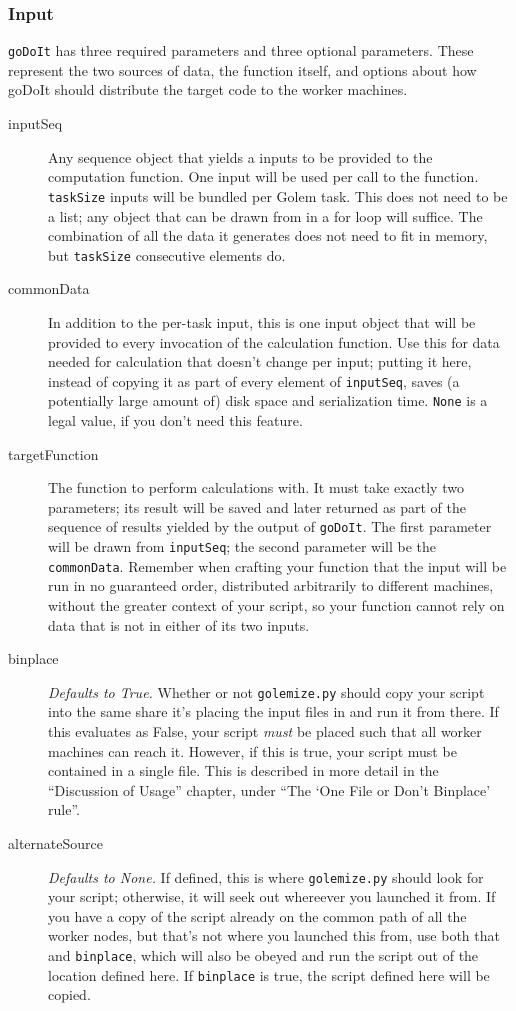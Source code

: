 \documentclass[11pt,ebook,oneside,final]{memoir} %
\begin{document}
\subsubsection*{Input}
\texttt{goDoIt} has three required parameters and three optional parameters. These represent the two sources of data, the function itself, and options about how goDoIt should distribute the target code to the worker machines.
\begin{description}
	\item[inputSeq] Any sequence object that yields a inputs to be provided to the computation function. One input will be used per call to the function. \texttt{taskSize} inputs will be bundled per Golem task. This does not need to be a list; any object that can be drawn from in a for loop will suffice. The combination of all the data it generates does not need to fit in memory, but \texttt{taskSize} consecutive elements do.
	\item[commonData] In addition to the per-task input, this is one input object that will be provided to every invocation of the calculation function. Use this for data needed for calculation that doesn't change per input; putting it here, instead of copying it as part of every element of \texttt{inputSeq}, saves (a potentially large amount of) disk space and serialization time. \texttt{None} is a legal value, if you don't need this feature.
	\item[targetFunction] The function to perform calculations with. It must take exactly two parameters; its result will be saved and later returned as part of the sequence of results yielded by the output of \texttt{goDoIt}. The first parameter will be drawn from \texttt{inputSeq}; the second parameter will be the \texttt{commonData}. Remember when crafting your function that the input will be run in no guaranteed order, distributed arbitrarily to different machines, without the greater context of your script, so your function cannot rely on data that is not in either of its two inputs.
	\item[binplace] \textit{Defaults to True.} Whether or not \texttt{golemize.py} should copy your script into the same share it's placing the input files in and run it from there. If this evaluates as False, your script \emph{must} be placed such that all worker machines can reach it. However, if this is true, your script must be contained in a single file. This is described in more detail in the ``Discussion of Usage'' chapter, under ``The `One File or Don't Binplace' rule''.
	\item[alternateSource] \textit{Defaults to None.} If defined, this is where \texttt{golemize.py} should look for your script; otherwise, it will seek out whereever you launched it from. If you have a copy of the script already on the common path of all the worker nodes, but that's not where you launched this from, use both that and \texttt{binplace}, which will also be obeyed and run the script out of the location defined here. If \texttt{binplace} is true, the script defined here will be copied.

\end{description}
\end{document}
